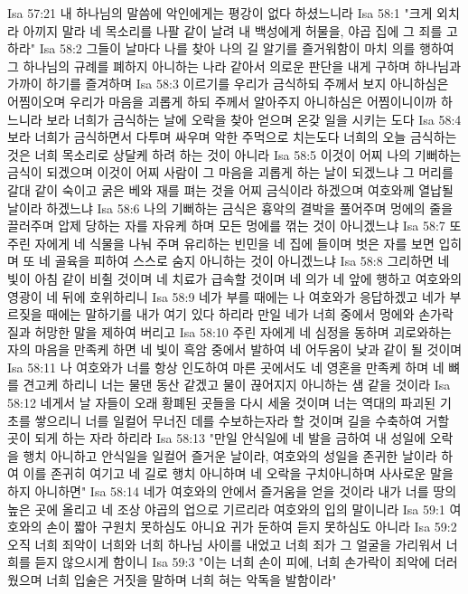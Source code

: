 Isa 57:21  내 하나님의 말씀에 악인에게는 평강이 없다 하셨느니라
Isa 58:1  "크게 외치라 아끼지 말라 네 목소리를 나팔 같이 날려 내 백성에게 허물을, 야곱 집에 그 죄를 고하라"
Isa 58:2  그들이 날마다 나를 찾아 나의 길 알기를 즐거워함이 마치 의를 행하여 그 하나님의 규례를 폐하지 아니하는 나라 같아서 의로운 판단을 내게 구하며 하나님과 가까이 하기를 즐겨하며
Isa 58:3  이르기를 우리가 금식하되 주께서 보지 아니하심은 어찜이오며 우리가 마음을 괴롭게 하되 주께서 알아주지 아니하심은 어찜이니이까 하느니라 보라 너희가 금식하는 날에 오락을 찾아 얻으며 온갖 일을 시키는 도다
Isa 58:4  보라 너희가 금식하면서 다투며 싸우며 악한 주먹으로 치는도다 너희의 오늘 금식하는 것은 너희 목소리로 상달케 하려 하는 것이 아니라
Isa 58:5  이것이 어찌 나의 기뻐하는 금식이 되겠으며 이것이 어찌 사람이 그 마음을 괴롭게 하는 날이 되겠느냐 그 머리를 갈대 같이 숙이고 굵은 베와 재를 펴는 것을 어찌 금식이라 하겠으며 여호와께 열납될 날이라 하겠느냐
Isa 58:6  나의 기뻐하는 금식은 흉악의 결박을 풀어주며 멍에의 줄을 끌러주며 압제 당하는 자를 자유케 하며 모든 멍에를 꺾는 것이 아니겠느냐
Isa 58:7  또 주린 자에게 네 식물을 나눠 주며 유리하는 빈민을 네 집에 들이며 벗은 자를 보면 입히며 또 네 골육을 피하여 스스로 숨지 아니하는 것이 아니겠느냐
Isa 58:8  그리하면 네 빛이 아침 같이 비췰 것이며 네 치료가 급속할 것이며 네 의가 네 앞에 행하고 여호와의 영광이 네 뒤에 호위하리니
Isa 58:9  네가 부를 때에는 나 여호와가 응답하겠고 네가 부르짖을 때에는 말하기를 내가 여기 있다 하리라 만일 네가 너희 중에서 멍에와 손가락질과 허망한 말을 제하여 버리고
Isa 58:10  주린 자에게 네 심정을 동하며 괴로와하는 자의 마음을 만족케 하면 네 빛이 흑암 중에서 발하여 네 어두움이 낮과 같이 될 것이며
Isa 58:11  나 여호와가 너를 항상 인도하여 마른 곳에서도 네 영혼을 만족케 하며 네 뼈를 견고케 하리니 너는 물댄 동산 같겠고 물이 끊어지지 아니하는 샘 같을 것이라
Isa 58:12  네게서 날 자들이 오래 황폐된 곳들을 다시 세울 것이며 너는 역대의 파괴된 기초를 쌓으리니 너를 일컬어 무너진 데를 수보하는자라 할 것이며 길을 수축하여 거할 곳이 되게 하는 자라 하리라
Isa 58:13  "만일 안식일에 네 발을 금하여 내 성일에 오락을 행치 아니하고 안식일을 일컬어 즐거운 날이라, 여호와의 성일을 존귀한 날이라 하여 이를 존귀히 여기고 네 길로 행치 아니하며 네 오락을 구치아니하며 사사로운 말을 하지 아니하면"
Isa 58:14  네가 여호와의 안에서 즐거움을 얻을 것이라 내가 너를 땅의 높은 곳에 올리고 네 조상 야곱의 업으로 기르리라 여호와의 입의 말이니라
Isa 59:1  여호와의 손이 짧아 구원치 못하심도 아니요 귀가 둔하여 듣지 못하심도 아니라
Isa 59:2  오직 너희 죄악이 너희와 너희 하나님 사이를 내었고 너희 죄가 그 얼굴을 가리워서 너희를 듣지 않으시게 함이니
Isa 59:3  "이는 너희 손이 피에, 너희 손가락이 죄악에 더러웠으며 너희 입술은 거짓을 말하며 너희 혀는 악독을 발함이라"
